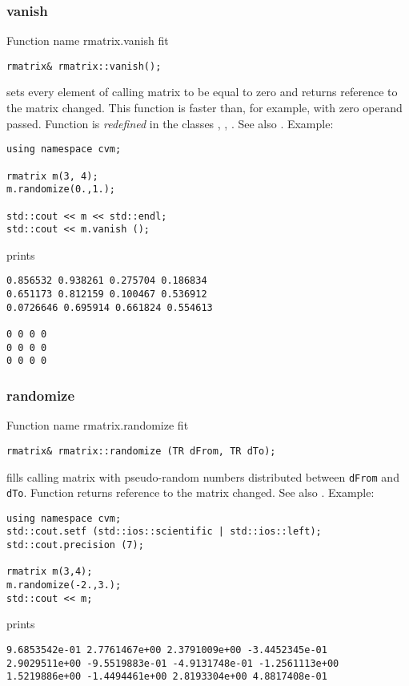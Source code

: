 \subsubsection{vanish}
Function%
\pdfdest name {rmatrix.vanish} fit
\begin{verbatim}
rmatrix& rmatrix::vanish();
\end{verbatim}
sets every element of  calling matrix to be equal to zero
and returns  reference to
the matrix changed. This function is faster
than, for example,
with zero operand passed.
Function is \emph{redefined} in the classes
, ,
.
See also .
Example:
\begin{Verbatim}
using namespace cvm;

rmatrix m(3, 4);
m.randomize(0.,1.);

std::cout << m << std::endl;
std::cout << m.vanish ();
\end{Verbatim}
prints
\begin{Verbatim}
0.856532 0.938261 0.275704 0.186834
0.651173 0.812159 0.100467 0.536912
0.0726646 0.695914 0.661824 0.554613

0 0 0 0
0 0 0 0
0 0 0 0
\end{Verbatim}
\newpage




\subsubsection{randomize}
Function%
\pdfdest name {rmatrix.randomize} fit
\begin{verbatim}
rmatrix& rmatrix::randomize (TR dFrom, TR dTo);
\end{verbatim}
fills  calling matrix with pseudo-random numbers distributed between
\verb"dFrom" and \verb"dTo".
Function
returns  reference to the matrix changed.
See also
.
Example:
\begin{Verbatim}
using namespace cvm;
std::cout.setf (std::ios::scientific | std::ios::left);
std::cout.precision (7);

rmatrix m(3,4);
m.randomize(-2.,3.);
std::cout << m;
\end{Verbatim}
prints
\begin{Verbatim}
9.6853542e-01 2.7761467e+00 2.3791009e+00 -3.4452345e-01
2.9029511e+00 -9.5519883e-01 -4.9131748e-01 -1.2561113e+00
1.5219886e+00 -1.4494461e+00 2.8193304e+00 4.8817408e-01
\end{Verbatim}
\newpage

